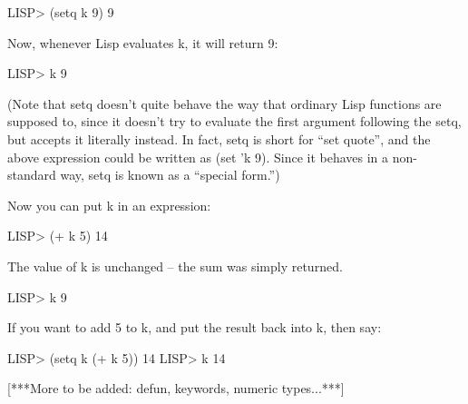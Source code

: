 LISP> (setq  k 9)
9

Now, whenever Lisp evaluates k, it will return 9:

LISP> k
9

(Note that setq doesn't quite behave the way that ordinary Lisp functions are
supposed to, since it doesn't try to evaluate the first argument
following the setq, but accepts it literally instead.  In fact, setq
is short for ``set quote'', and the above expression could be written
as (set 'k 9).  Since it behaves in a non-standard way, setq
is known as a ``special form.'')

Now you can put k in an expression:

LISP> (+ k 5)
14

The value of k is unchanged -- the sum was simply returned.

LISP> k
9

If you want to add 5 to k, and put the result back into k,
then say:

LISP> (setq k (+ k 5))
14
LISP> k
14

[***More to be added: defun, keywords, numeric types...***]
